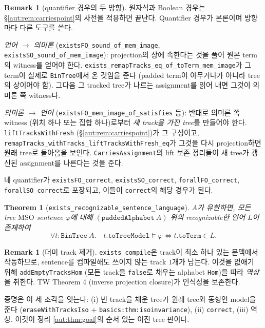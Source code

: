 \documentclass[11pt]{article}
\theoremstyle{definition}
\newtheorem{remark}[definition]{Remark}
\theoremstyle{plain}
\newtheorem{theorem}[definition]{Theorem}
\newcommand{\MSO}{\mathrm{MSO}}
\newcommand{\lean}[1]{\texttt{#1}}
\begin{document}
\begin{remark}[quantifier 경우의 두 방향]
\label{aut:rem:quantifierconverse}
원자식과 Boolean 경우는 \S\ref{aut:rem:carriespoint}의 사전을 적용하면
끝난다. Quantifier 경우가 본론이며 방향마다 다른 도구를 쓴다.

\emph{언어 $\to$ 의미론} (\lean{existsFO\_sound\_of\_mem\_image},
\lean{existsSO\_sound\_of\_mem\_image}): projection의 상에 속한다는 것을
풀어 원본 term의 witness를 얻어야 한다. \lean{exists\_remapTracks\_eq\_of\_toTerm\_mem\_image}가
그 term이 실제로 \lean{BinTree}에서 온 것임을 준다 (padded term이 아무거나가
아니라 tree의 상이어야 함). 그다음 그 tracked tree가 나르는 assignment를
읽어 내면 그것이 의미론 쪽 witness다.

\emph{의미론 $\to$ 언어} (\lean{existsFO\_mem\_image\_of\_satisfies} 등):
반대로 의미론 쪽 witness (위치 하나 또는 집합 하나)로부터 \emph{새 track을
가진 tree}를 만들어야 한다. \lean{liftTracksWithFresh}
(\S\ref{aut:rem:carriespoint})가 그 구성이고,
\lean{remapTracks\_withTracks\_liftTracksWithFresh\_eq}가 그것을 다시
projection하면 원래 tree로 돌아옴을 보인다. \lean{CarriesAssignment}의 lift
보존 정리들이 새 tree가 갱신된 assignment를 나른다는 것을 준다.

네 quantifier가 \lean{existsFO\_correct}, \lean{existsSO\_correct},
\lean{forallFO\_correct}, \lean{forallSO\_correct}로 포장되고, 이들이
\lean{correct}의 해당 경우가 된다.
\end{remark}

\begin{theorem}[\lean{exists\_recognizable\_sentence\_language}]
\label{aut:thm:sentencelanguage}
$A$가 유한하면, 모든 tree $\MSO$ sentence $\varphi$에 대해
$(\lean{paddedAlphabet}\ A)$ 위의 recognizable한 언어 $L$이 존재하여
\[
  \forall t : \lean{BinTree}\ A.\quad
  t.\lean{toTreeModel} \models \varphi \iff t.\lean{toTerm} \in L.
\]
\end{theorem}

\begin{remark}[더미 track 제거]
\lean{exists\_compile}은 track이 최소 하나 있는 문맥에서 작동하므로, sentence를
컴파일해도 쓰이지 않는 track $1$개가 남는다. 이것을 없애기 위해
\lean{addEmptyTracksHom} (모든 track을 \lean{false}로 채우는 alphabet
\lean{Hom})을 따라 \emph{역상}을 취한다. TW Theorem 4 (inverse projection
closure)가 인식성을 보존한다.

증명은 이 세 조각을 잇는다: (i) 빈 track을 채운 tree가 원래 tree와 동형인
model을 준다 (\lean{eraseWithTracksIso} $+$
\lean{basics:thm:isoinvariance}), (ii) \lean{correct}, (iii) 역상.
이것이 정리 \ref{aut:thm:goal}의 순서 있는 이진 tree 판이다.
\end{remark}
\end{document}

